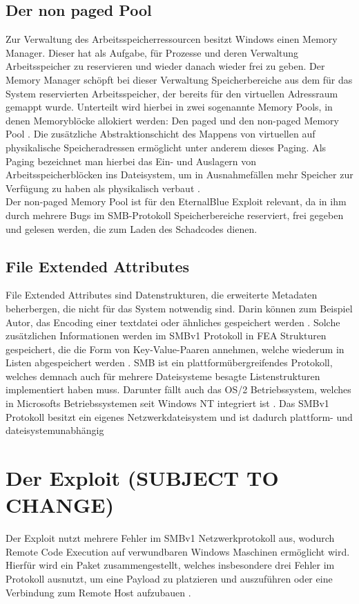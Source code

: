 \documentclass[DIV=12,headings=normal,pdftex,headinclude=false,footinclude=false,final]{scrreprt}
\begin{document}
\section{Der non paged Pool}
Zur Verwaltung des Arbeitsspeicherressourcen besitzt Windows einen Memory Manager. Dieser hat als Aufgabe, für Prozesse und deren Verwaltung Arbeitsspeicher zu reservieren und wieder danach wieder frei zu geben. Der Memory Manager schöpft bei dieser Verwaltung Speicherbereiche aus dem für das System reservierten Arbeitsspeicher, der bereits für den virtuellen Adressraum gemappt wurde. Unterteilt wird hierbei in zwei sogenannte Memory Pools, in denen Memoryblöcke allokiert werden: Den paged und den non-paged Memory Pool \cite{MS:MemPools}. Die zusätzliche Abstraktionschicht des Mappens von virtuellen auf physikalische Speicheradressen ermöglicht unter anderem dieses Paging. Als Paging bezeichnet man hierbei das Ein- und Auslagern von Arbeitsspeicherblöcken ins Dateisystem, um in Ausnahmefällen mehr Speicher zur Verfügung zu haben als physikalisch verbaut \cite{CompWeek:Paging}.\\
Der non-paged Memory Pool ist für den EternalBlue Exploit relevant, da in ihm durch mehrere Bugs im SMB-Protokoll Speicherbereiche reserviert, frei gegeben und gelesen werden, die zum Laden des Schadcodes dienen.

\section{File Extended Attributes}
File Extended Attributes sind Datenstrukturen, die erweiterte Metadaten beherbergen, die nicht für das System notwendig sind. Darin können zum Beispiel Autor, das Encoding einer textdatei oder ähnliches gespeichert werden \cite{Wiki:FEA}. Solche zusätzlichen Informationen werden im SMBv1 Protokoll in FEA Strukturen gespeichert, die die Form von Key-Value-Paaren annehmen, welche wiederum in Listen abgespeichert werden \cite{CP}. SMB ist ein plattformübergreifendes Protokoll, welches demnach auch für mehrere Dateisysteme besagte Listenstrukturen implementiert haben muss. Darunter fällt auch das OS/2 Betriebssystem, welches in Microsofts Betriebssystemen seit Windows NT integriert ist \cite{MS:OS2Subsys}. Das SMBv1 Protokoll besitzt ein eigenes Netzwerkdateisystem und ist dadurch plattform- und dateisystemunabhängig \cite{CompWeek:SMB}

\chapter{Der Exploit (SUBJECT TO CHANGE)}
Der Exploit nutzt mehrere Fehler im SMBv1 Netzwerkprotokoll aus, wodurch Remote Code Execution auf verwundbaren Windows Maschinen ermöglicht wird.\\ Hierfür wird ein Paket zusammengestellt, welches insbesondere drei Fehler im Protokoll ausnutzt, um eine Payload zu platzieren und auszuführen oder eine Verbindung zum Remote Host aufzubauen \cite{Medium}. 
\end{document}
